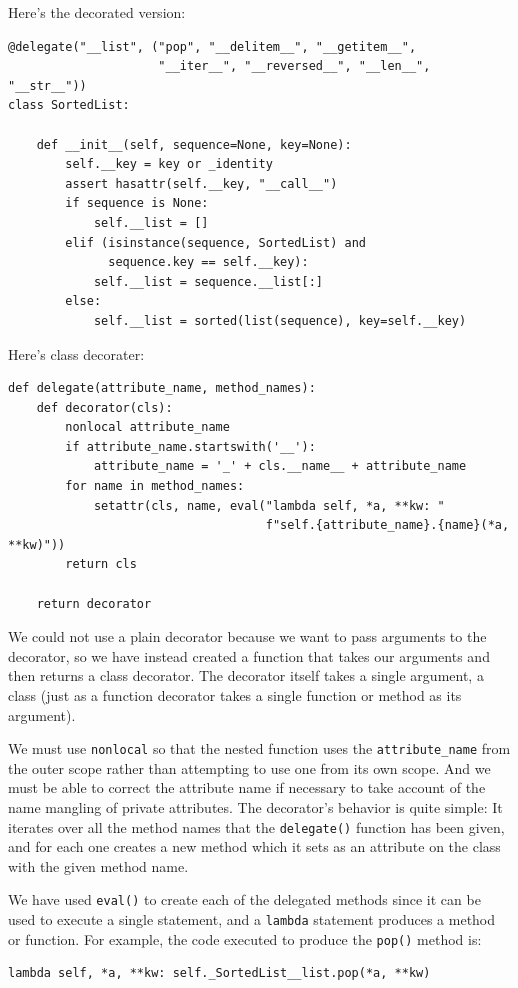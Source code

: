 Here's the decorated version:
\begin{lstlisting}
@delegate("__list", ("pop", "__delitem__", "__getitem__",
                     "__iter__", "__reversed__", "__len__", "__str__"))
class SortedList:

    def __init__(self, sequence=None, key=None):
        self.__key = key or _identity
        assert hasattr(self.__key, "__call__")
        if sequence is None:
            self.__list = []
        elif (isinstance(sequence, SortedList) and
              sequence.key == self.__key):
            self.__list = sequence.__list[:]
        else:
            self.__list = sorted(list(sequence), key=self.__key)
\end{lstlisting}

Here's class decorater:
\begin{lstlisting}
def delegate(attribute_name, method_names):
    def decorator(cls):
        nonlocal attribute_name
        if attribute_name.startswith('__'):
            attribute_name = '_' + cls.__name__ + attribute_name
        for name in method_names:
            setattr(cls, name, eval("lambda self, *a, **kw: "
                                    f"self.{attribute_name}.{name}(*a, **kw)"))
        return cls

    return decorator  
\end{lstlisting}

We could not use a plain decorator because we want to pass arguments to the decorator, so we have instead created a function that takes our arguments and then returns a class decorator.
The decorator itself takes a single argument, a class (just as a function decorator takes a single function or method as its argument).


We must use \verb|nonlocal| so that the nested function uses the \verb|attribute_name| from the outer scope rather than attempting to use one from its own scope.
And we must be able to correct the attribute name if necessary to take account of the name mangling of private attributes.
The decorator’s behavior is quite simple:
It iterates over all the method names that the \verb|delegate()| function has been given, and for each one creates a new method which it sets as an attribute on the class with the given method name.


We have used \verb|eval()| to create each of the delegated methods since it can be used to execute a single statement, and a \verb|lambda| statement produces a method or function.
For example, the code executed to produce the \verb|pop()| method is:
\begin{lstlisting}
lambda self, *a, **kw: self._SortedList__list.pop(*a, **kw)  
\end{lstlisting}


